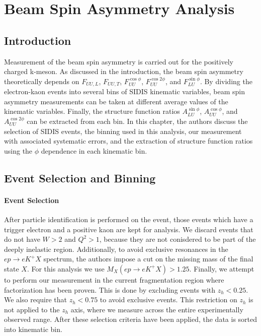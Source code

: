 \chapter{Beam Spin Asymmetry Analysis}

\section{Introduction}
Measurement of the beam spin asymmetry is carried out for the positively charged k-meson.  As discussed in the introduction, the beam spin asymmetry theoretically depends on $F_{UU,L}$, $F_{UU,T}$, $F_{UU}^{\cos\phi}$, $F_{UU}^{\cos 2\phi}$, and $F_{LU}^{\sin\phi}$.  By dividing the electron-kaon events into several bins of SIDIS kinematic variables, beam spin asymmetry measurements can be taken at different average values of the kinematic variables.  Finally, the structure function ratios $A_{LU}^{\sin\phi}$, $A_{UU}^{\cos\phi}$, and $A_{UU}^{\cos 2\phi}$ can be extracted from each bin.  In this chapter, the authors discuss the selection of SIDIS events, the binning used in this analysis, our measurement with associated systematic errors, and the extraction of structure function ratios using the $\phi$ dependence in each kinematic bin.

\section{Event Selection and Binning}
\subsubsection*{Event Selection}
After particle identification is performed on the event, those events which have a trigger electron and a positive kaon are kept for analysis.  We discard events that do not have $W > 2$ and $Q^2 > 1$, because they are not conisdered to be part of the deeply inelastic region.  Additionally, to avoid exclusive resonances in the $ep \rightarrow eK^+X$ spectrum, the authors impose a cut on the missing mass of the final state $X$.  For this analysis we use $M_{X} (ep \rightarrow eK^+X) > 1.25$.  Finally, we attempt to perform our measurement in the current fragmentation region where factorization has been proven.  This is done by excluding events with $z_h < 0.25$.  We also require that $z_h < 0.75$ to avoid exclusive events.  This restriction on $z_h$ is not applied to the $z_h$ axis, where we measure across the entire experimentally observed range.  After these selection criteria have been applied, the data is sorted into kinematic bin.

